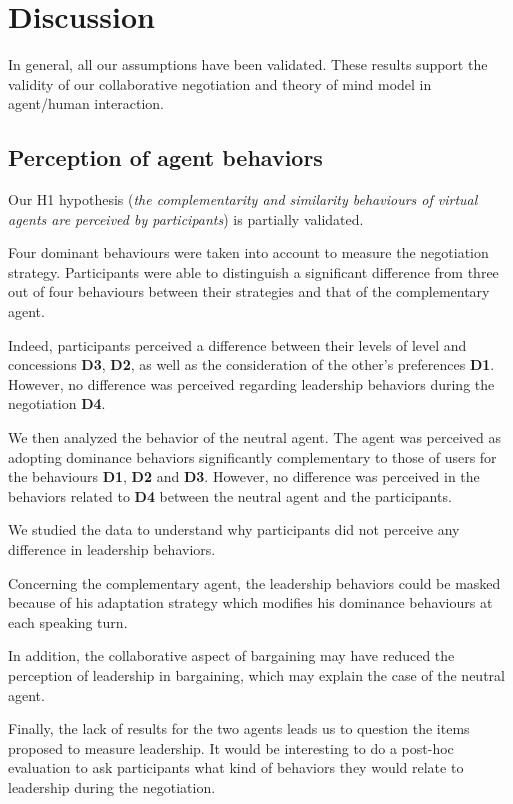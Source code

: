 \documentclass[10pt, a4paper, twocolumn]{article} %
\begin{document}
\section{Discussion}
\label{sec:discussion}
In general, all our assumptions have been validated. These results support the validity of our collaborative negotiation and theory of mind model in agent/human interaction.   

\subsection{Perception of agent behaviors}
Our H1 hypothesis (\textit{the complementarity and similarity behaviours of virtual agents are perceived by participants}) is partially validated. 

Four dominant behaviours were taken into account to measure the negotiation strategy. 
Participants were able to distinguish a significant difference from three out of four behaviours between their strategies and that of the complementary agent.

Indeed, participants perceived a difference between their levels of level and concessions \textbf{D3}, \textbf{D2}, as well as the consideration of the other's preferences \textbf{D1}. However, no difference was perceived regarding leadership behaviors during the negotiation \textbf{D4}. 

We then analyzed the behavior of the neutral agent. The agent was perceived as adopting dominance behaviors significantly complementary to those of users for the behaviours \textbf{D1}, \textbf{D2} and \textbf{D3}. 
However, no difference was perceived in the behaviors related to \textbf{D4} between the neutral agent and the participants. 

We studied the data to understand why participants did not perceive any difference in leadership behaviors. 

Concerning the complementary agent, the leadership behaviors could be masked because of his adaptation strategy which modifies his dominance behaviours at each speaking turn.

In addition, the collaborative aspect of bargaining may have reduced the perception of leadership in bargaining, which may explain the case of the neutral agent. 

Finally, the lack of results for the two agents leads us to question the items proposed to measure leadership. 
It would be interesting to do a post-hoc evaluation to ask participants what kind of behaviors they would relate to leadership during the negotiation.
\end{document}
